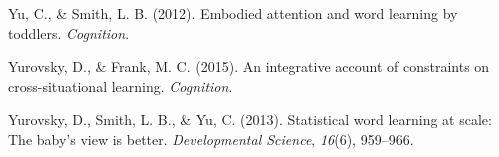 \documentclass[authoryear, review]{elsarticle}
\begin{document}
\hypertarget{ref-yu2012embodied}{}
Yu, C., \& Smith, L. B. (2012). Embodied attention and word learning by
toddlers. \emph{Cognition}.

\hypertarget{ref-yurovsky2014algorithmic}{}
Yurovsky, D., \& Frank, M. C. (2015). An integrative account of
constraints on cross-situational learning. \emph{Cognition}.

\hypertarget{ref-yurovsky2013statistical}{}
Yurovsky, D., Smith, L. B., \& Yu, C. (2013). Statistical word learning
at scale: The baby's view is better. \emph{Developmental Science},
\emph{16}(6), 959--966.


\end{document}

